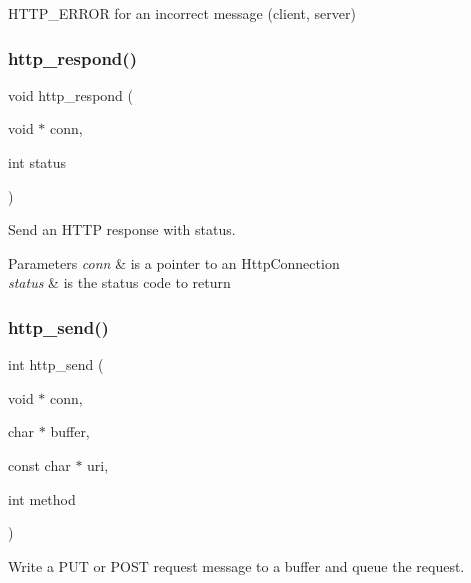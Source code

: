 H\+T\+T\+P\+\_\+\+E\+R\+R\+OR for an incorrect message (client, server) \mbox{\label{group__http__connection_gaa760070967803d689c4dd0fc407ff563}} 
\subsubsection{\texorpdfstring{http\+\_\+respond()}{http\_respond()}}
{\footnotesize\ttfamily void http\+\_\+respond (\begin{DoxyParamCaption}\item[{void $\ast$}]{conn,  }\item[{int}]{status }\end{DoxyParamCaption})}



Send an H\+T\+TP response with status. 


\begin{DoxyParams}{Parameters}
{\em conn} & is a pointer to an Http\+Connection \\
\hline
{\em status} & is the status code to return \\
\hline
\end{DoxyParams}
\mbox{\label{group__http__connection_ga9d3a703c0cf3b053e915eaec5b394c28}} 
\subsubsection{\texorpdfstring{http\+\_\+send()}{http\_send()}}
{\footnotesize\ttfamily int http\+\_\+send (\begin{DoxyParamCaption}\item[{void $\ast$}]{conn,  }\item[{char $\ast$}]{buffer,  }\item[{const char $\ast$}]{uri,  }\item[{int}]{method }\end{DoxyParamCaption})}



Write a P\+UT or P\+O\+ST request message to a buffer and queue the request. 

